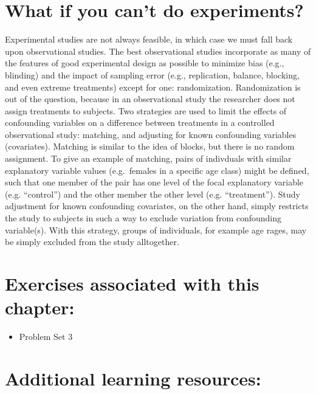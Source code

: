 \documentclass[]{book}
\providecommand{\tightlist}{%
  \setlength{\itemsep}{0pt}\setlength{\parskip}{0pt}}
\begin{document}
\hypertarget{what-if-you-cant-do-experiments}{%
\section{What if you can't do experiments?}\label{what-if-you-cant-do-experiments}}

Experimental studies are not always feasible, in which case we must fall back upon observational studies. The best observational studies incorporate as many of the features of good experimental design as possible to minimize bias (e.g., blinding) and the impact of sampling error (e.g., replication, balance, blocking, and even extreme treatments) except for one: randomization. Randomization is out of the question, because in an observational study the researcher does not assign treatments to subjects. Two strategies are used to limit the effects of confounding variables on a difference between treatments in a controlled observational study: matching, and adjusting for known confounding variables (covariates). Matching is similar to the idea of blocks, but there is no random assignment. To give an example of matching, pairs of indivduals with similar explanatory variable values (e.g.~females in a specific age class) might be defined, such that one member of the pair has one level of the focal explanatory variable (e.g. ``control'') and the other member the other level (e.g. ``treatment''). Study adjustment for known confounding covariates, on the other hand, simply restricts the study to subjects in such a way to exclude variation from confounding variable(s). With this strategy, groups of individuals, for example age rages, may be simply excluded from the study alltogether.

\hypertarget{exercises-associated-with-this-chapter-5}{%
\section{Exercises associated with this chapter:}\label{exercises-associated-with-this-chapter-5}}

\begin{itemize}
\tightlist
\item
  Problem Set 3
\end{itemize}

\hypertarget{additional-learning-resources-5}{%
\section{Additional learning resources:}\label{additional-learning-resources-5}}
\end{document}
